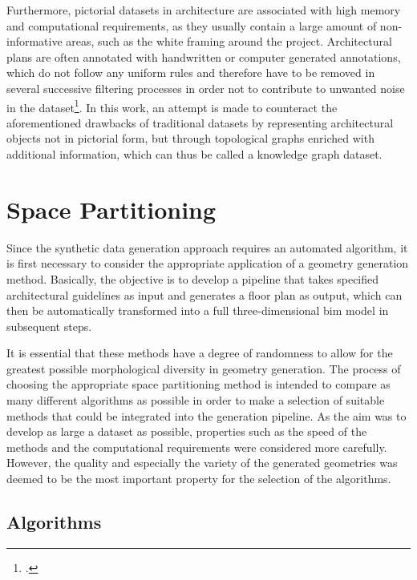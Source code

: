 \documentclass[a4paper, 12pt]{report}
\begin{document}
Furthermore, pictorial datasets in architecture are associated with high memory and computational requirements, as they usually contain a large amount of non-informative areas, such as the white framing around the project. Architectural plans are often annotated with handwritten or computer generated annotations, which do not follow any uniform rules and therefore have to be removed in several successive filtering processes in order not to contribute to unwanted noise in the dataset\footcite{newton2019deep}. In this work, an attempt is made to counteract the aforementioned drawbacks of traditional datasets by representing architectural objects not in pictorial form, but through topological graphs enriched with additional information, which can thus be called a \gls{knowledge graph} dataset.

\section{Space Partitioning}\label{sec:space-partitioning}

Since the synthetic data generation approach requires an automated algorithm, it is first necessary to consider the appropriate application of a geometry generation method. Basically, the objective is to develop a pipeline that takes specified architectural guidelines as input and generates a floor plan as output, which can then be automatically transformed into a full three-dimensional \acrshort{bim} model in subsequent steps.

It is essential that these methods have a degree of randomness to allow for the greatest possible morphological diversity in geometry generation. The process of choosing the appropriate space partitioning method is intended to compare as many different algorithms as possible in order to make a selection of suitable methods that could be integrated into the generation pipeline. As the aim was to develop as large a dataset as possible, properties such as the speed of the methods and the computational requirements were considered more carefully. However, the quality and especially the variety of the generated geometries was deemed to be the most important property for the selection of the algorithms.

\subsection{Algorithms}\label{subsec:algorithms}
\end{document}
